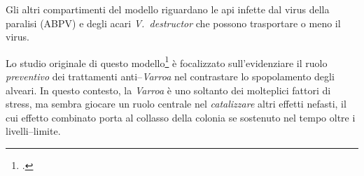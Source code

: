 Gli altri compartimenti del modello riguardano le api infette dal virus della paralisi (ABPV) e degli acari
\emph{V.~destructor} che possono trasportare o meno il virus.

Lo studio originale di questo modello\footcite{ratti2017} è focalizzato sull'evidenziare il ruolo \emph{preventivo}
dei trattamenti anti--\emph{Varroa} nel contrastare lo spopolamento degli alveari.
In questo contesto, la \emph{Varroa} è uno soltanto dei molteplici fattori di stress, ma sembra giocare
un ruolo centrale nel \emph{catalizzare} altri effetti nefasti, il cui effetto combinato porta al collasso
della colonia se sostenuto nel tempo oltre i livelli--limite.




